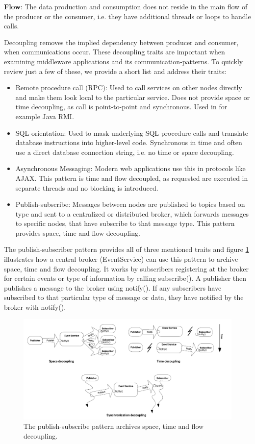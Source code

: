 \noindent \textbf{Flow}: The data production and consumption does not reside in the main flow of the producer or the consumer, i.e. they have additional threads or loops to handle calls.

\noindent Decoupling removes the implied dependency between producer and consumer, when communications occur. These decoupling traits are important when examining middleware applications and its communication-patterns. To quickly review just a few of these, we provide a short list and address their traits:

\begin{itemize}
	\item Remote procedure call (RPC): Used to call services on other nodes directly and make them look local to the particular service. Does not provide space or time decoupling, as call is point-to-point and synchronous. Used in for example Java RMI.
	\item SQL orientation: Used to mask underlying SQL procedure calls and translate database instructions into higher-level code. Synchronous in time and often use a direct database connection string, i.e. no time or space decoupling.
	\item Asynchronous Messaging: Modern web applications use this in protocols like AJAX. This pattern is time and flow decoupled, as requested are executed in separate threads and no blocking is introduced.
	\item Publish-subscribe: Messages between nodes are published to topics based on type and sent to a centralized or distributed broker, which forwards messages to specific nodes, that have subscribe to that message type. This pattern provides space, time and flow decoupling.
\end{itemize}

\noindent The publish-subscriber pattern provides all of three mentioned traits and figure \ref{fig:pubsub} illustrates how a central broker (EventService) can use this pattern to archive space, time and flow decoupling. It works by subscribers registering at the broker for certain events or type of information by calling subscribe(). A publisher then publishes a message to the broker using notify(). If any subscribers have subscribed to that particular type of message or data, they have notified by the broker with notify().

\begin{figure}[h!]\label{}
	\centering
	\includegraphics[scale=0.5]{middleware/pubsub.png}
	\caption{The publish-subscribe pattern archives space, time and flow decoupling.}
	\label{fig:pubsub}
\end{figure}